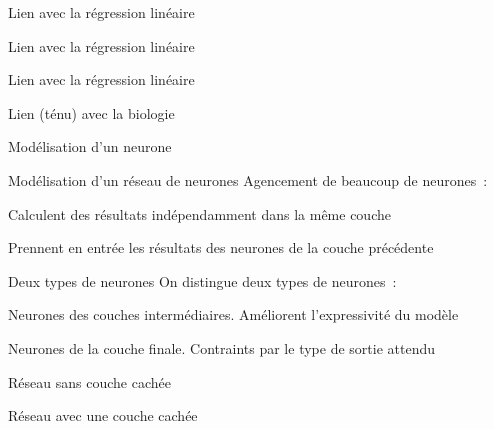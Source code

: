 \begin{frame}{Lien avec la régression linéaire}
\end{frame}

\begin{frame}{Lien avec la régression linéaire}
\end{frame}

\begin{frame}{Lien avec la régression linéaire}
\end{frame}

\begin{frame}{Lien (ténu) avec la biologie}
\end{frame}

\begin{frame}{Modélisation d'un neurone}
\end{frame}

\begin{frame}{Modélisation d'un réseau de neurones}
  Agencement de beaucoup de neurones~:
  \begin{description}[<+->]
    \item[En parallèle] Calculent des résultats indépendamment dans la même couche
    \item[En série] Prennent en entrée les résultats des neurones de la couche précédente
  \end{description}
\end{frame}

\begin{frame}{Deux types de neurones}
  On distingue deux types de neurones~:
  \begin{description}[<+->]
    \item[Neurones cachés] Neurones des couches intermédiaires. Améliorent l'expressivité du modèle
    \item[Neurones de sortie] Neurones de la couche finale. Contraints par le type de sortie attendu
  \end{description}
\end{frame}

\begin{frame}{Réseau sans couche cachée}
  \centering
\end{frame}

\begin{frame}{Réseau avec une couche cachée}
  \centering
\end{frame}

